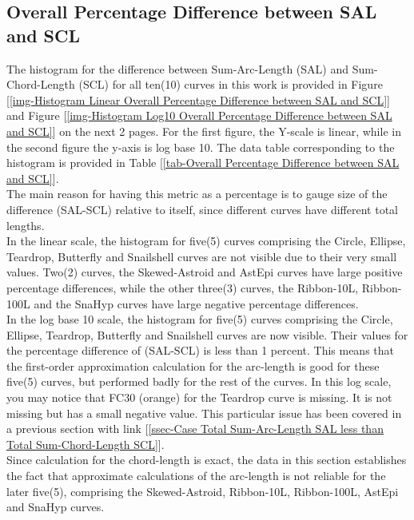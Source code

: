 \clearpage
\pagebreak

\subsection{Overall Percentage Difference between SAL and SCL}

The histogram for the difference between Sum-Arc-Length (SAL) and Sum-Chord-Length (SCL) for all ten(10) curves in this work is provided in Figure [\ref{img-Histogram Linear Overall Percentage Difference between SAL and SCL}] and Figure [\ref{img-Histogram Log10 Overall Percentage Difference between SAL and SCL}] on the next 2 pages. For the first figure, the Y-scale is linear, while in the second figure the y-axis is log base 10. The data table corresponding to the histogram is provided in Table [\ref{tab-Overall Percentage Difference between SAL and SCL}]. \\

The main reason for having this metric as a percentage is to gauge size of the difference (SAL-SCL) relative to itself, since different curves have different total lengths. \\

In the linear scale, the histogram for five(5) curves comprising the Circle, Ellipse, Teardrop, Butterfly and Snailshell curves are not visible due to their very small values. Two(2) curves, the Skewed-Astroid and AstEpi curves have large positive percentage differences, while the other three(3) curves, the Ribbon-10L, Ribbon-100L and the SnaHyp curves have large negative percentage differences. \\

In the log base 10 scale, the histogram for five(5) curves comprising the Circle, Ellipse, Teardrop, Butterfly and Snailshell curves are now visible. Their values for the percentage difference of (SAL-SCL) is less than 1 percent. This means that the first-order approximation calculation for the arc-length is good for these five(5) curves, but performed badly for the rest of the curves. In this log scale, you may notice that FC30 (orange) for the Teardrop curve is missing. It is not missing but has a small negative value. This particular issue has been covered in a previous section with link [\ref{ssec-Case Total Sum-Arc-Length SAL less than Total Sum-Chord-Length SCL}]. \\   

Since calculation for the chord-length is exact, the data in this section establishes the fact that approximate calculations of the arc-length is not reliable for the later five(5), comprising the Skewed-Astroid, Ribbon-10L, Ribbon-100L, AstEpi and SnaHyp curves. \\ 


